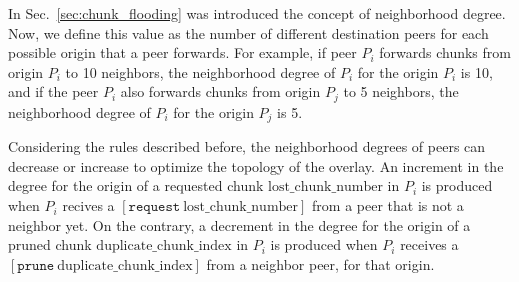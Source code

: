 In Sec.~\ref{sec:chunk_flooding} was introduced the concept of
neighborhood degree. Now, we define this value as the number of
different destination peers for each possible origin that a peer
forwards. For example, if peer $P_i$ forwards chunks from origin $P_i$
to 10 neighbors, the neighborhood degree of $P_i$ for the origin $P_i$
is 10, and if the peer $P_i$ also forwards chunks from origin $P_j$ to 5
neighbors, the neighborhood degree of $P_i$ for the origin $P_j$ is 5.

Considering the rules described before, the neighborhood degrees of
peers can decrease or increase to optimize the topology of the
overlay. An increment in the degree for the origin of a requested
chunk $\text{lost\_chunk\_number}$ in $P_i$ is produced when $P_i$
recives a $[\mathtt{request}~\text{lost\_chunk\_number}]$ from a peer
that is not a neighbor yet. On the contrary, a decrement in the degree
for the origin of a pruned chunk $\text{duplicate\_chunk\_index}$ in
$P_i$ is produced when $P_i$ receives a
$[\mathtt{prune}~\text{duplicate\_chunk\_index}]$ from a neighbor
peer, for that origin.
